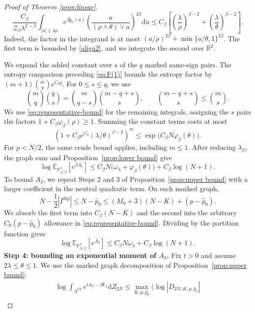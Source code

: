 \documentclass[a4paper,10pt,leqno]{amsart}
\numberwithin{equation}{section}
\newcommand{\R}{\mathbb{R}}
\newcommand{\dd}{\mathrm{d}}
\def\Esp{\mathbb{E}}
\def\mc{\mathcal}
\def\P{\mathbb{P}_{N,\beta}^{\lambda}}
\def\g{\mathsf{g}}
\def\F{\mathsf{F}}
\newcommand{\dip}{\mathrm{dip}}
\begin{document}
\begin{proof}[Proof of Theorem \ref{prop:linear}]
  \begin{equation*}
    \frac{C_\beta}{\mc Z_\beta\lambda^{2-\beta}}
    \int_{|u|\le4\rho}e^{\beta\g_\lambda(u)}
    \left(\frac{a}{(\rho\wedge\theta)\vee a}\right)^{2\beta}\dd u
    \le C_\beta\left[\left(\frac\lambda\rho\right)^{\beta-2}
    +\left(\frac\lambda\theta\right)^{\beta-2}\right].
  \end{equation*}
  Indeed, the factor in the integrand is at most $(a/\rho)^{2\beta}+\min\{a/\theta,1\}^{2\beta}$. The first term is bounded by \eqref{align2}, and we integrate the second over $\R^2$.

  We expand the added constant over $s$ of the $q$ marked same-sign pairs. The entropy comparison preceding \eqref{eq:F(1)} bounds the entropy factor by $(m+1)\binom mq e^{C_0q}$. For $0\le s\le q$, we use
  \[
    \binom mq\binom qs=\binom m{q-s}\binom{m-q+s}s,
    \qquad \binom{m-q+s}s\le\binom ms.
  \]
  We use \eqref{eq:representative-bound} for the remaining integrals, assigning the $s$ pairs the factors $1+C_\beta\varphi_\beta(\rho)\ge1$. Summing the constant terms costs at most
  \[
    \left(1+C_\beta e^{C_0}(\lambda/\theta)^{\beta-2}\right)^m
    \le\exp\bigl(C_\beta N\varphi_\beta(\theta)\bigr).
  \]
  For $p<N/2$, the same crude bound applies, including $m\le1$. After reducing $\lambda_\beta$, the graph sum and Proposition~\ref{prop:lower bound} give
  \begin{equation}\label{eq:A1}
    \log\Esp_{\P}[e^{\beta A_1}]
    \le C_\beta N\bigl(\omega_\lambda+\varphi_\beta(\theta)\bigr)+C_\beta\log(N+1).
  \end{equation}
  To bound $A_2$, we repeat Steps 2 and 3 of Proposition~\ref{prop:upper bound} with a larger coefficient in the neutral quadratic term. On each marked graph,
  \[
    N-\frac12|I^\dip|\le N-\widehat p_0\le(M_0+3)(N-K)+(p-\widehat p_0).
  \]
  We absorb the first term into $C_\beta(N-K)$ and the second into the arbitrary $C_0(p-\widehat p_0)$ allowance in \eqref{eq:representative-bound}. Dividing by the partition function gives
  \begin{equation}\label{eq:A2}
    \log\Esp_{\P}[e^{A_2}]\le C_\beta N\omega_\lambda+C_\beta\log(N+1).
  \end{equation}
  \textbf{Step 4: bounding an exponential moment of $A_3$.} Fix $t>0$ and assume $2\lambda\le\theta\le1$. We use the marked graph decomposition of Proposition~\ref{prop:upper bound}:
  \begin{multline*}
    \log\int_{\Lambda^{2N}} e^{tA_3-\beta\F_\lambda}\dd Z_{2N}
    \le\max_{K,p,\widehat p_0}\Bigg(\log|D_{2N,K,p,\widehat p_0}|\\

\end{multline*}
\end{proof}
\end{document}
